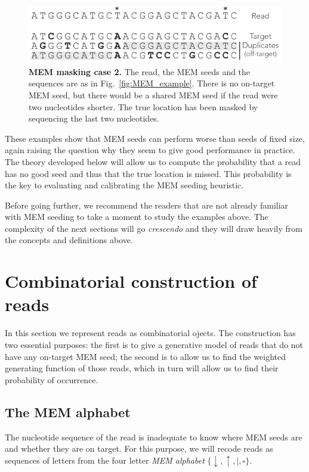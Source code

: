 \documentclass{article}
\begin{document}
\begin{figure}[h]
\centering
\includegraphics[scale=1]{short_vs_long_example.pdf}
\caption{\textbf{MEM masking case 2.}
The read, the MEM seeds and the sequences are as in
Fig.~\ref{fig:MEM_example}. There is no on-target MEM seed, but there
would be a shared MEM seed if the read were two nucleotides shorter. The
true location has been masked by sequencing the last two nucleotides.}
\label{fig:short_vs_long}
\end{figure}

These examples show that MEM seeds can perform worse than seeds of fixed
size, again raising the question why they seem to give good performance in
practice. The theory developed below will allow us to compute the
probability that a read has no good seed and thus that the true location
is missed. This probability is the key to evaluating and calibrating the
MEM seeding heuristic.

Before going further, we recommend the readers that are not already
familiar with MEM seeding to take a moment to study the examples above.
The complexity of the next sections will go \textit{crescendo} and they
will draw heavily from the concepts and definitions above.


\section{Combinatorial construction of reads}

In this section we represent reads as combinatorial ojects. The
construction has two essential purposes: the first is to give a generative
model of reads that do not have any on-target MEM seed; the second is to
allow us to find the weighted generating function of those reads, which in
turn will allow us to find their probability of occurrence.

\subsection{The MEM alphabet}

The nucleotide sequence of the read is inadequate to know where MEM seeds
are and whether they are on target. For this purpose, we will recode reads
as sequences of letters from the four letter \emph{MEM alphabet}
$\{\downarrow, \uparrow, |, \square\}$.
\end{document}
